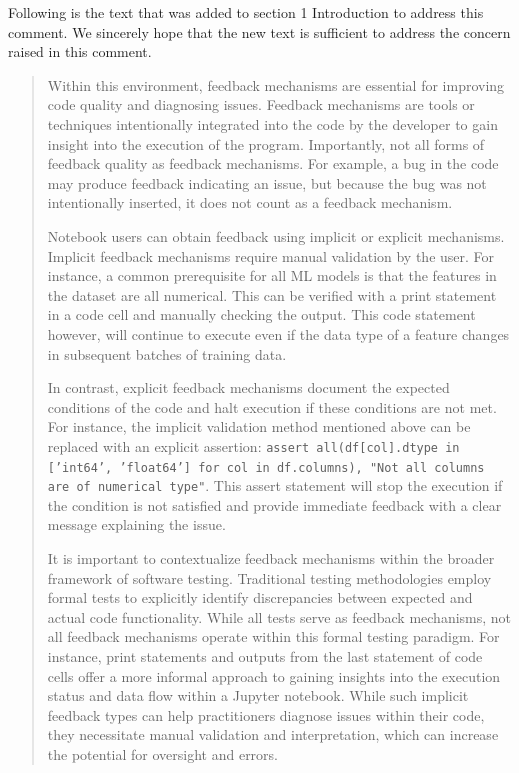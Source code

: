 \documentclass[11pt,fleqn]{article}
\begin{document}
Following is the text that was added to section 1 Introduction to address this comment. We sincerely hope that the new text is sufficient to address the concern raised in this comment.

\begin{quote}
  Within this environment, feedback mechanisms are essential for improving code quality and diagnosing issues. Feedback mechanisms are tools or techniques intentionally integrated into the code by the developer to gain insight into the execution of the program. Importantly, not all forms of feedback quality as feedback mechanisms. For example, a bug in the code may produce feedback indicating an issue, but because the bug was not intentionally inserted, it does not count as a feedback mechanism.

  Notebook users can obtain feedback using implicit or explicit mechanisms. Implicit feedback mechanisms require manual validation by the user. For instance, a common prerequisite for all ML models is that the features in the dataset are all numerical. This can be verified with a print statement in a code cell and manually checking the output. This code statement however, will continue to execute even if the data type of a feature changes in subsequent batches of training data.

  In contrast, explicit feedback mechanisms document the expected conditions of the code and halt execution if these conditions are not met. For instance, the implicit validation method mentioned above can be replaced with an explicit assertion: \texttt{assert all(df[col].dtype in ['int64', 'float64'] for col in df.columns), "Not all columns are of numerical type"}. This assert statement will stop the execution if the condition is not satisfied and provide immediate feedback with a clear message explaining the issue.

  It is important to contextualize feedback mechanisms within the broader framework of software testing. Traditional testing methodologies employ formal tests to explicitly identify discrepancies between expected and actual code functionality. While all tests serve as feedback mechanisms, not all feedback mechanisms operate within this formal testing paradigm. For instance, print statements and outputs from the last statement of code cells offer a more informal approach to gaining insights into the execution status and data flow within a Jupyter notebook. While such implicit feedback types can help practitioners diagnose issues within their code, they necessitate manual validation and interpretation, which can increase the potential for oversight and errors.
\end{quote}
\end{document}
